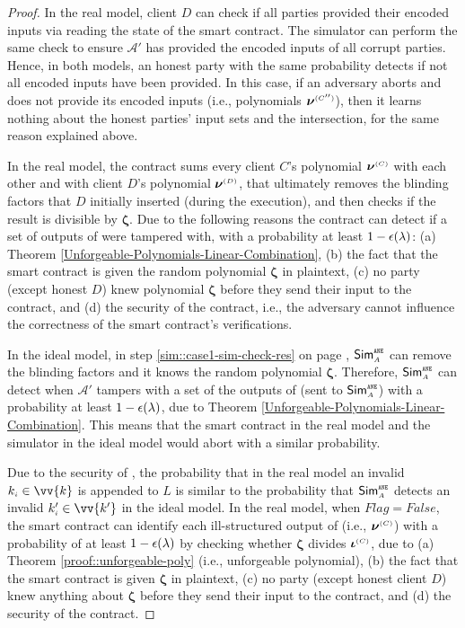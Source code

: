 \begin{proof}
In the real model, client $D$ can check if all parties provided their encoded inputs via reading the state of the smart contract.  The simulator can perform the same check to ensure  $\mathcal{A}'$ has provided the encoded inputs of all corrupt parties. Hence, in both models, an honest party with the same probability detects if not all encoded inputs have been provided. In this case, if an adversary aborts and does not provide its encoded inputs (i.e., polynomials ${\bm\nu}^{ \scriptscriptstyle {  {(C'')}} }$), then it learns nothing about the honest parties' input sets and the intersection, for the same reason explained above. 



In the real model,  the contract sums every client $C$'s polynomial $\bm\nu^{ \scriptscriptstyle {  {(C)}} }$ with each other and with client $D$'s polynomial $\bm\nu^{ \scriptscriptstyle {  {(D)}} }$, that ultimately removes the blinding factors that  $D$ initially inserted (during the \vopr execution), and then checks if the result is divisible by  $\bm \zeta$. Due to the following reasons the contract can detect if a set of outputs of \vopr were tampered with, with a probability at least $1-\epsilon(\lambda)$: (a) Theorem \ref{Unforgeable-Polynomials-Linear-Combination}, (b) the fact that the smart contract is given the random polynomial $\bm \zeta$ in plaintext, (c) no party (except honest $D$) knew polynomial $\bm \zeta$ before they send their input to the contract, and (d) the security of the contract, i.e., the adversary cannot influence the correctness of the smart contract's verifications.



In the ideal model, in step \ref{sim::case1-sim-check-res} on page \pageref{sim::case1-sim-check-res}, $\mathsf{Sim}^{\scriptscriptstyle \mathtt{ANE}}_{\scriptscriptstyle A}$  can remove the blinding factors and it knows the random polynomial ${\bm \zeta}$. Therefore, $\mathsf{Sim}^{\scriptscriptstyle \mathtt{ANE}}_{\scriptscriptstyle A}$ can detect when $\mathcal{A}'$ tampers with a set of the outputs of \vopr (sent to  $\mathsf{Sim}^{\scriptscriptstyle \mathtt{ANE}}_{\scriptscriptstyle A}$) with a probability at least $1-\epsilon(\lambda)$,  due to Theorem \ref{Unforgeable-Polynomials-Linear-Combination}. This means that the smart contract in the real model and the simulator in the ideal model would abort with a similar probability. 




Due to the security of \zspaa, the probability that in the real model an invalid $k_{\st i}\in \vv{k}$ is appended to $ L$ is similar to the probability that  $\mathsf{Sim}^{\scriptscriptstyle \mathtt{ANE}}_{\scriptscriptstyle A}$ detects an invalid $ k'_{\st i}\in \vv{k'}$ in the ideal model. In the real model, when $Flag=False$, the smart contract can identify each ill-structured output of \vopr (i.e.,  $\bm\nu^{ \scriptscriptstyle {  {(C)}} }$) with a probability of at least $1-\epsilon(\lambda)$ by checking whether $\bm\zeta$  divides $\bm\iota^{ \scriptscriptstyle {  {(C)}}}$, due to  (a) Theorem \ref{proof::unforgeable-poly} (i.e., unforgeable polynomial), (b) the fact that the smart contract is given $\bm \zeta$ in plaintext, (c) no party (except honest client $D$) knew anything about $\bm \zeta$ before they send their input to the contract, and (d) the security of the contract.  


\end{proof}
